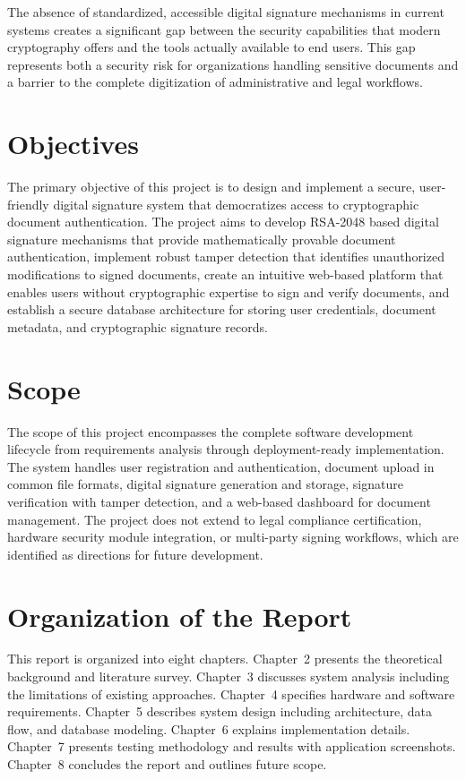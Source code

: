 The absence of standardized, accessible digital signature mechanisms in current systems creates a significant gap between the security capabilities that modern cryptography offers and the tools actually available to end users. This gap represents both a security risk for organizations handling sensitive documents and a barrier to the complete digitization of administrative and legal workflows.

\section{Objectives}

The primary objective of this project is to design and implement a secure, user-friendly digital signature system that democratizes access to cryptographic document authentication. The project aims to develop RSA-2048 based digital signature mechanisms that provide mathematically provable document authentication, implement robust tamper detection that identifies unauthorized modifications to signed documents, create an intuitive web-based platform that enables users without cryptographic expertise to sign and verify documents, and establish a secure database architecture for storing user credentials, document metadata, and cryptographic signature records.

\section{Scope}

The scope of this project encompasses the complete software development lifecycle from requirements analysis through deployment-ready implementation. The system handles user registration and authentication, document upload in common file formats, digital signature generation and storage, signature verification with tamper detection, and a web-based dashboard for document management. The project does not extend to legal compliance certification, hardware security module integration, or multi-party signing workflows, which are identified as directions for future development.

\section{Organization of the Report}

This report is organized into eight chapters. Chapter~2 presents the theoretical background and literature survey. Chapter~3 discusses system analysis including the limitations of existing approaches. Chapter~4 specifies hardware and software requirements. Chapter~5 describes system design including architecture, data flow, and database modeling. Chapter~6 explains implementation details. Chapter~7 presents testing methodology and results with application screenshots. Chapter~8 concludes the report and outlines future scope.
